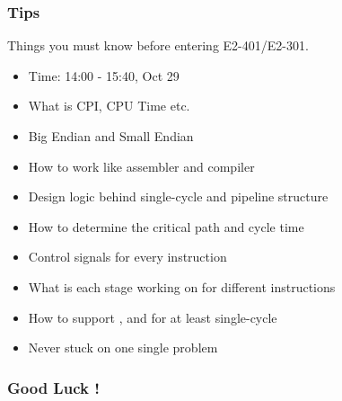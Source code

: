 \documentclass[xcolor=table]{beamer}
\begin{document}
\begin{mdframe}%

\frametitle{Tips}\label{heading-sec-tips}%

\noindent{}Things you must know before entering E2-401/E2-301.%

\begin{itemize}[noitemsep,topsep=\mdcompacttopsep]%

\item{}Time: 14:00 - 15:40, Oct 29%

\item{}What is CPI, CPU Time etc.%

\item{}Big Endian and Small Endian%

\item{}How to work like assembler and compiler%

\item{}Design logic behind single-cycle and pipeline structure%

\item{}How to determine the critical path and cycle time%

\item{}Control signals for every instruction%

\item{}What is each stage working on for different instructions%

\item{}How to support ,  and  for at least single-cycle%

\item{}Never stuck on one single problem%
\end{itemize}%
\end{mdframe}\label{sec-tips}%

\begin{mdframe}%

\frametitle{Good Luck !}\label{heading-sec-good-luck-}%
\end{mdframe}\label{sec-good-luck-}%
\end{document}
